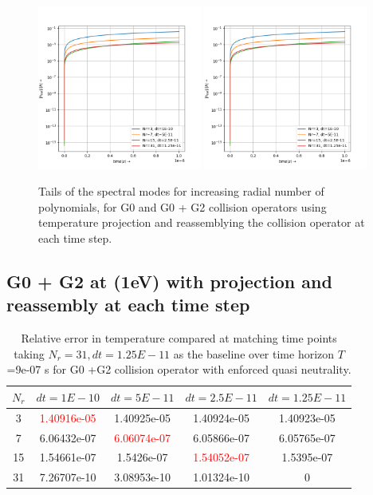 \documentclass{article}
\begin{document}
\begin{figure}[H]
\includegraphics[width=0.48\textwidth]{fig/g0_tails_nr_dt.png}
\includegraphics[width=0.48\textwidth]{fig/g02_tails_nr_dt.png}
\caption{Tails of the spectral modes for increasing radial number of polynomials, for G0 and G0 + G2 collision operators using temperature projection and reassemblying the collision operator at each time step. \label{fig:proj_g0_g02_tails}}
\end{figure}

\subsection{G0 + G2 at (1eV) with projection and reassembly at each time step}
\begin{table}[H]
	\centering
	\begin{tabular}{|c|c|c|c|c|}
		\hline
		$N_r$ & $dt=1E-10$ & $dt=5E-11$ & $dt=2.5E-11$ & $dt=1.25E-11$\\
		\hline
		
		 3   & \textcolor{red}{1.40916e-05} & 1.40925e-05 &  1.40924e-05  &  1.40923e-05 \\
		 7   & 6.06432e-07 & \textcolor{red}{6.06074e-07} &  6.05866e-07  &  6.05765e-07 \\
		 15  & 1.54661e-07 & 1.5426e-07  &  \textcolor{red}{1.54052e-07}  &  1.5395e-07  \\
		 31  & 7.26707e-10 & 3.08953e-10 &  1.01324e-10  &  0  \\
		\hline
	\end{tabular}
\caption{Relative error in temperature compared at matching time points taking $N_r=31,dt=1.25E-11$ as the baseline over time horizon $T$=9e-07 s for G0 +G2 collision operator with enforced quasi neutrality.}
\end{table}
\end{document}
